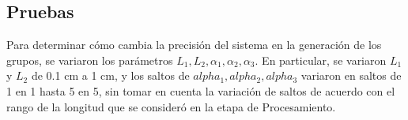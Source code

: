 \subsection{Pruebas}

Para determinar cómo cambia la precisión del sistema en la generación de los grupos, se variaron los parámetros $L_1, L_2, \alpha_1, \alpha_2, \alpha_3$. En particular, se variaron $L_1$ y $L_2$ de 0.1 cm a 1 cm, y los saltos de $alpha_1, alpha_2, alpha_3$ variaron en saltos de 1 en 1 hasta 5 en 5, sin tomar en cuenta la variación de saltos de acuerdo con el rango de la longitud que se consideró en la etapa de Procesamiento.